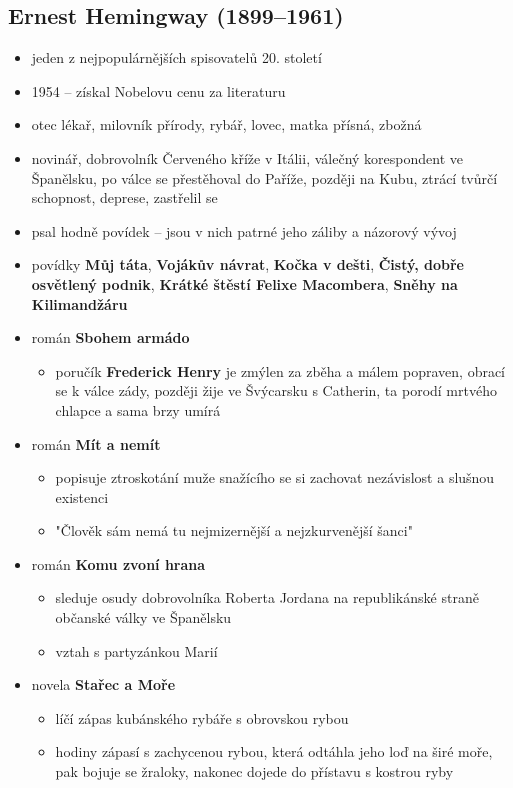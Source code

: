 \subsection{Ernest Hemingway (1899--1961)}
\begin{itemize}
\item jeden z nejpopulárnějších spisovatelů 20. století
\item 1954 -- získal Nobelovu cenu za literaturu
\item otec lékař, milovník přírody, rybář, lovec, matka přísná, zbožná
\item novinář, dobrovolník Červeného kříže v Itálii, válečný korespondent ve Španělsku, po válce se přestěhoval do Paříže, později na Kubu, ztrácí tvůrčí schopnost, deprese, zastřelil se
\item psal hodně povídek -- jsou v nich patrné jeho záliby a názorový vývoj
\item povídky \textbf{Můj táta}, \textbf{Vojákův návrat}, \textbf{Kočka v dešti}, \textbf{Čistý, dobře osvětlený podnik}, \textbf{Krátké štěstí Felixe Macombera}, \textbf{Sněhy na Kilimandžáru}
\item  román \textbf{Sbohem armádo}
	\begin{itemize}
	\item poručík \textbf{Frederick Henry} je zmýlen za zběha a málem popraven, obrací se k válce zády, později žije ve Švýcarsku s Catherin, ta porodí mrtvého chlapce a sama brzy umírá
	\end{itemize}
\item román \textbf{Mít a nemít}
	\begin{itemize}
	\item popisuje ztroskotání muže snažícího se si zachovat nezávislost a slušnou existenci
	\item "Člověk sám nemá tu nejmizernější a nejzkurvenější šanci"
	\end{itemize}
\item román \textbf{Komu zvoní hrana}
	\begin{itemize}
	\item sleduje osudy dobrovolníka Roberta Jordana na republikánské straně občanské války ve Španělsku
	\item vztah s partyzánkou Marií
	\end{itemize}
\item novela \textbf{Stařec a Moře}
	\begin{itemize}
	\item líčí zápas kubánského rybáře s obrovskou rybou
	\item hodiny zápasí s zachycenou rybou, která odtáhla jeho loď na širé moře, pak bojuje se žraloky, nakonec dojede do přístavu s kostrou ryby

\end{itemize}
\end{itemize}
